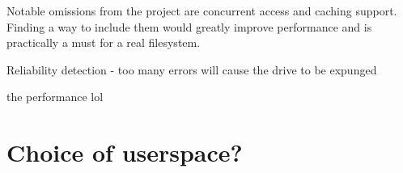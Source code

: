         Notable omissions from the project are concurrent access and caching
        support. Finding a way to include them would greatly improve
        performance and is practically a must for a real filesystem.

        Reliability detection - too many errors will cause the drive to be expunged

        the performance lol

    \section{Choice of userspace?}
